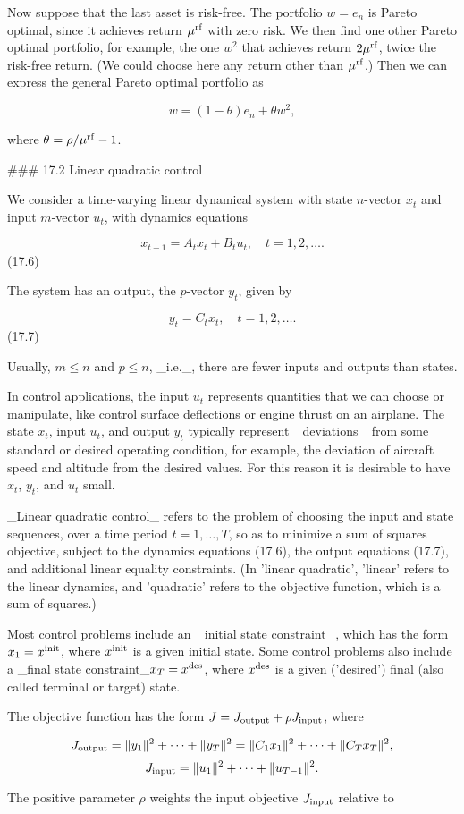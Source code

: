 Now suppose that the last asset is risk-free. The portfolio \(w=e_{n}\) is Pareto optimal, since it achieves return \(\mu^{\rm rf}\) with zero risk. We then find one other Pareto optimal portfolio, for example, the one \(w^{2}\) that achieves return \(2\mu^{\rm rf}\), twice the risk-free return. (We could choose here any return other than \(\mu^{\rm rf}\).) Then we can express the general Pareto optimal portfolio as

\[w=(1-\theta)e_{n}+\theta w^{2},\]

where \(\theta=\rho/\mu^{\rm rf}-1\).

### 17.2 Linear quadratic control

We consider a time-varying linear dynamical system with state \(n\)-vector \(x_{t}\) and input \(m\)-vector \(u_{t}\), with dynamics equations

\[x_{t+1}=A_{t}x_{t}+B_{t}u_{t},\quad t=1,2,\ldots.\] (17.6)

The system has an output, the \(p\)-vector \(y_{t}\), given by

\[y_{t}=C_{t}x_{t},\quad t=1,2,\ldots.\] (17.7)

Usually, \(m\leq n\) and \(p\leq n\), _i.e._, there are fewer inputs and outputs than states.

In control applications, the input \(u_{t}\) represents quantities that we can choose or manipulate, like control surface deflections or engine thrust on an airplane. The state \(x_{t}\), input \(u_{t}\), and output \(y_{t}\) typically represent _deviations_ from some standard or desired operating condition, for example, the deviation of aircraft speed and altitude from the desired values. For this reason it is desirable to have \(x_{t}\), \(y_{t}\), and \(u_{t}\) small.

_Linear quadratic control_ refers to the problem of choosing the input and state sequences, over a time period \(t=1,\ldots,T\), so as to minimize a sum of squares objective, subject to the dynamics equations (17.6), the output equations (17.7), and additional linear equality constraints. (In 'linear quadratic', 'linear' refers to the linear dynamics, and 'quadratic' refers to the objective function, which is a sum of squares.)

Most control problems include an _initial state constraint_, which has the form \(x_{1}=x^{\rm init}\), where \(x^{\rm init}\) is a given initial state. Some control problems also include a _final state constraint_\(x_{T}=x^{\rm des}\), where \(x^{\rm des}\) is a given ('desired') final (also called terminal or target) state.

The objective function has the form \(J=J_{\rm output}+\rho J_{\rm input}\), where

\[J_{\rm output} = \|y_{1}\|^{2}+\cdots+\|y_{T}\|^{2}=\|C_{1}x_{1}\|^{2}+\cdots+\|C_ {T}x_{T}\|^{2},\] \[J_{\rm input} = \|u_{1}\|^{2}+\cdots+\|u_{T-1}\|^{2}.\]

The positive parameter \(\rho\) weights the input objective \(J_{\rm input}\) relative to 